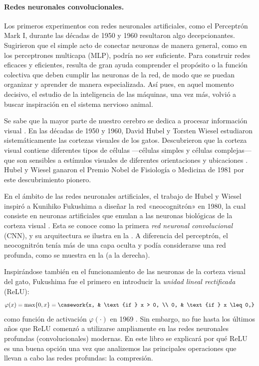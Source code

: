 \documentclass[../../book-main_es.tex]{subfiles}
\begin{document}
\paragraph{Redes neuronales convolucionales.}
Los primeros experimentos con redes neuronales artificiales, como el Perceptrón Mark I,
durante las décadas de 1950 y 1960 resultaron algo decepcionantes. Sugirieron
que el simple acto de conectar neuronas de manera general, como en
los perceptrones multicapa (MLP), podría no ser suficiente. Para construir redes eficaces
y eficientes, resulta de gran ayuda comprender el
propósito o la función colectiva que deben cumplir las neuronas de la red, de modo
que se puedan organizar y aprender de manera especializada. Así pues, en
aquel momento decisivo, el estudio de la inteligencia de las máquinas, una vez más, volvió a
buscar inspiración en el sistema nervioso animal.

Se sabe que la mayor parte de nuestro cerebro se dedica a procesar información visual
\cite{PalmerS1999}. En las décadas de 1950 y 1960, David Hubel
y Torsten Wiesel estudiaron sistemáticamente las cortezas visuales de
los gatos. Descubrieron que la corteza visual contiene diferentes tipos
de células ---células simples y células complejas--- que son sensibles a
estímulos visuales de diferentes orientaciones y ubicaciones
\cite{Hubel-Wiesel-1959}. Hubel y Wiesel ganaron el Premio Nobel de
Fisiología o Medicina de 1981 por este descubrimiento pionero.

En el ámbito de las redes neuronales artificiales, el trabajo de Hubel y Wiesel
inspiró a Kunihiko Fukushima a diseñar la red «neocognitrón» en
1980, la cual consiste en neuronas artificiales que emulan a las neuronas biológicas
de la corteza visual \cite{Fukushima1980NeocognitronAS}. Esta se conoce como la 
primera \textit{red neuronal convolucional} (CNN), y su arquitectura se ilustra en la
. A diferencia del perceptrón, el neocognitrón tenía
más de una capa oculta y podía considerarse una red profunda, como
se muestra en la  (a la derecha).

Inspirándose también en el funcionamiento de las neuronas de la corteza visual del gato,
Fukushima fue el primero en introducir la \textit{unidad lineal rectificada} (ReLU):
\begin{equation}
    \varphi(x) = \max\{0, x\} = \casework{x, & \text{if } x > 0,
    \\ 0, & \text{if } x \leq 0,}
\end{equation}
como función de activación \(\varphi(\cdot)\) en 1969
\cite{Fukushima-1969}. Sin embargo, no fue hasta los últimos años que
ReLU comenzó a utilizarse ampliamente en las redes neuronales profundas (convolucionales)
modernas. En este libro se explicará por qué ReLU es una buena opción una vez que
analizemos las principales operaciones que llevan a cabo las redes profundas: la compresión.
\end{document}
